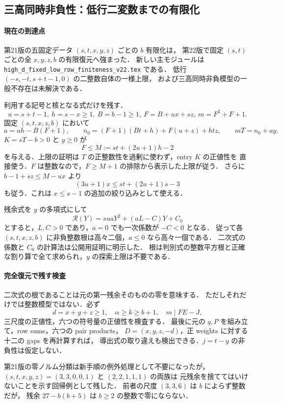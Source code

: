 \subsection{三高同時非負性：低行二変数までの有限化}
\label{notes:hd22}

\paragraph{現在の到達点}

第21版の五固定データ $(s,t,x,y,z)$ ごとの $b$ 有限化は，
第22版で固定 $(s,t)$ ごとの全 $x,y,z,b$ の有限復元へ強まった．
新しい主モジュールは
\nolinkurl{high_d_fixed_low_row_finiteness_v22.tex} である．
低行 $(-s,-t,s+t-1,0)$ の二整数自体の一様上限，
および三高同時非負模型の一般不存在は未解決である．

利用する記号と核となる式だけを残す．
\[
 u=s+t-1,\ h=s-x\ge1,\ B=b-1\ge1,\
 F=B+ux+sz,\ m=F^2+F+1.
\]
固定 $(s,t,x,z,b)$ において
\[
 a=uh-B(F+1),\qquad
 n_0=(F+1)(Bt+h)+F(u+z)+htz,
 \qquad mT=n_0+ay.
\]
$K=sT-b>0$ と $y\ge0$ が
\[
 \boxed{F\le M:=st+(2u+1)h-2}
\]
を与える．上限の証明は $T$ の正整数性を過剰に使わず，entry $K$ の正値性を
直接使う．$F$ は整数なので，$F\ge M+1$ の排除から表示した上限が従う．
さらに $b-1+sz\le M-ux$ より
\[
 (3u+1)x\le st+(2u+1)s-3
\]
も従う．これは $x\le s-1$ の追加の絞り込みとして使える．

残余式を $y$ の多項式にして
\[
 \mathcal R(Y)=suaY^2+(aL-C)Y+C_0
\]
とすると，$L,C>0$ であり，$a=0$ でも一次係数が $-C<0$ となる．
従って各 $(s,t,x,z,b)$ に非負整数根は高々二個，$a\le0$ なら高々一個である．
二次式の係数と $C_0$ の計算法は公開用証明に明示した．
根は判別式の整数平方根と正確な割り算で全て求められ，$y$ の探索上限は不要である．

\paragraph{完全復元で残す検査}

二次式の根であることは元の第一残余そのものの零を意味する．
ただしそれだけでは整数模型ではない．必ず
\[
 d=x+y+z\ge1,\quad \alpha\ge k\ge b+1,\quad m\mid FE-J,
\]
三尺度の正値性，六つの符号量の正値性を検査する．
最後に元の $q,P$ を組み立て，row sums，六つの pair products，
$D=(x,y,z,-d)$，正 weights に対する十二の gaps を再計算すれば，
導出式の取り違えも検出できる．$j=t-y$ の非負性は仮定しない．

第21版の零ノルム分類は新手順の例外処理として不要になったが，
$(s,t,x,y,z)=(3,3,0,0,1)$ と $(2,2,1,1,1)$ の両族は
元残余を捨ててはいけないことを示す回帰例として残した．
前者の尺度 $(3,3,6)$ は $b$ によらず整数だが，
残余 $27-b(b+5)$ は $b\ge2$ の整数で零にならない．

